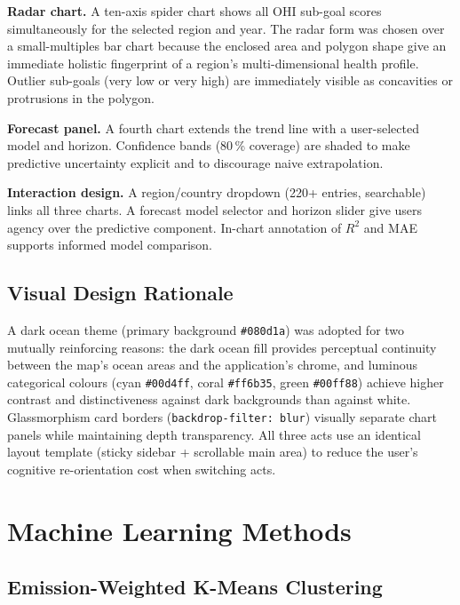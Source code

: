 \documentclass[10pt,twocolumn]{article}
\begin{document}
\textbf{Radar chart.}
A ten-axis spider chart shows all OHI sub-goal scores simultaneously for the
selected region and year.
The radar form was chosen over a small-multiples bar chart because the
enclosed area and polygon shape give an immediate holistic fingerprint of a
region's multi-dimensional health profile.
Outlier sub-goals (very low or very high) are immediately visible as
concavities or protrusions in the polygon.

\textbf{Forecast panel.}
A fourth chart extends the trend line with a user-selected model and horizon.
Confidence bands (80\,\% coverage) are shaded to make predictive uncertainty
explicit and to discourage naive extrapolation.

\textbf{Interaction design.}
A region/country dropdown (220+ entries, searchable) links all three charts.
A forecast model selector and horizon slider give users agency over the
predictive component.
In-chart annotation of $R^2$ and MAE supports informed model comparison.

\subsection{Visual Design Rationale}

A dark ocean theme (primary background \texttt{\#080d1a}) was adopted for two
mutually reinforcing reasons: the dark ocean fill provides perceptual
continuity between the map's ocean areas and the application's chrome, and
luminous categorical colours (cyan \texttt{\#00d4ff}, coral
\texttt{\#ff6b35}, green \texttt{\#00ff88}) achieve higher contrast and
distinctiveness against dark backgrounds than against white.
Glassmorphism card borders (\texttt{backdrop-filter: blur}) visually separate
chart panels while maintaining depth transparency.
All three acts use an identical layout template (sticky sidebar + scrollable
main area) to reduce the user's cognitive re-orientation cost when switching
acts.

\section{Machine Learning Methods}

\subsection{Emission-Weighted K-Means Clustering}
\end{document}
